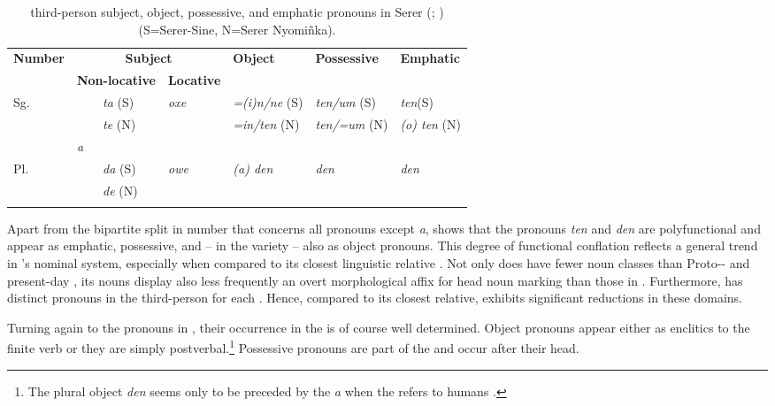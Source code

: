 \documentclass[output=paper,newtxmath,modfonts,nonflat,hidelinks]{langsci/langscibook}
\begin{document}
\begin{table}
\begin{tabularx}{\textwidth}{Xllllll}
\lsptoprule
\bfseries Number & \multicolumn{3}{c}{ \bfseries Subject} & \bfseries Object & \bfseries Possessive & \bfseries Emphatic \\
& \multicolumn{2}{l}{\bfseries Non-locative} & \multicolumn{1}{l}{\bfseries Locative} &  & \\
\midrule
\small Sg. & & \textit{ta} (S) & \textit{oxe} & \textit{=(i)n/ne} (S) &  \textit{ten/um} (S) & \textit{ten}(S) \normalsize \\
 	& & \textit{te} (N) &   & \textit{=in/ten} (N) &   \textit{ten/=um} (N) & \textit{(o) ten} (N) \\
 & \textit{a} & & & & & \\
Pl. &  & \textit{da} (S) &   \textit{owe} & \textit{(a) den} & \textit{den} & \textit{den} \\
 & & \textit{de} (N) & 	 &	 	\\
\lspbottomrule
\end{tabularx}
\normalsize
\caption{third-person subject, object, possessive, and emphatic pronouns in Serer (\citealt{Faye1979}; \citealt{Renaudier2012}) (S=Serer-Sine, N=Serer Nyomiñka).}
\label{tab:apel:1}
\end{table}



Apart from the bipartite split in number that concerns all pronouns except \textit{a},  shows that the pronouns \textit{ten} and \textit{den} are polyfunctional and appear as emphatic, possessive, and -- in the  variety -- also as object pronouns. This degree of functional conflation reflects a general trend in ’s nominal system, especially when compared to its closest linguistic relative . Not only does  have fewer noun classes than Proto-- and present-day  \citep{Merrill14}, its nouns display also less frequently an overt morphological affix for head noun marking than those in . Furthermore,  has distinct pronouns in the third-person for each . Hence, compared to its closest relative,  exhibits significant reductions in these domains. 

Turning again to the pronouns in , their occurrence in the  is of course well determined. Object pronouns appear either as enclitics to the finite verb or they are simply postverbal.\footnote{The plural object  \textit{den} seems only to be preceded by the  \textit{a} when the  refers to humans \citep[112-116]{Renaudier2012}.} Possessive pronouns are part of the  and occur after their head.
\end{document}
